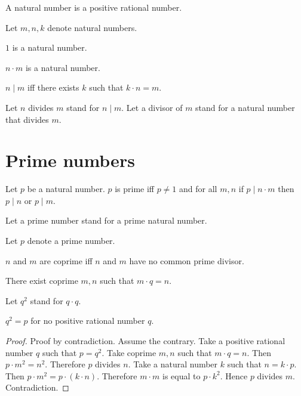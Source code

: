 \documentclass{article}
\begin{document}
  \begin{forthel}
    \begin{signature}
      A natural number is a positive rational number.
    \end{signature}

    Let $m, n, k$ denote natural numbers.

    \begin{signature}
        $1$ is a natural number.
    \end{signature}

    \begin{axiom}
      $n \cdot m$ is a natural number.
    \end{axiom}

    \begin{definition}
      $n \mid m$ iff there exists $k$ such that $k \cdot n = m$.
    \end{definition}

    Let $n$ divides $m$ stand for $n \mid m$. Let a divisor of $m$ stand for a natural number that divides $m$.
  \end{forthel}

  \section*{Prime numbers}

  \begin{forthel}
    \begin{definition}
      Let $p$ be a natural number.
      $p$ is prime iff $p\neq 1$ and for all $m, n$
      if $p\mid n\cdot m$ then $p \mid n$ or $p \mid m$.
    \end{definition}

    Let a prime number stand for a prime natural number.

    Let $p$ denote a prime number.

    \begin{definition}
      $n$ and $m$ are coprime iff $n$ and $m$ have no common prime divisor.
    \end{definition}

    \begin{axiom}
      There exist coprime $m,n$ such that $m \cdot q = n$.
    \end{axiom}

    Let $q^{2}$ stand for $q \cdot q$.

    \begin{proposition}
      $q^{2} = p$ for no positive rational number $q$.
    \end{proposition}
    \begin{proof}
      Proof by contradiction. 
      Assume the contrary. 
      Take a positive rational number $q$ such that $p = q^{2}$. 
      Take coprime $m,n$ such that $m \cdot q = n$. 
      Then $p \cdot m^{2} = n^{2}$. 
      Therefore $p$ divides $n$. 
      Take a natural number $k$ such that $n = k \cdot p$. 
      Then $p \cdot m^{2} = p \cdot (k \cdot n)$. 
      Therefore $m \cdot m$ is equal to $p \cdot k^{2}$. 
      Hence $p$ divides $m$. 
      Contradiction.
    \end{proof}
  \end{forthel}
\end{document}
